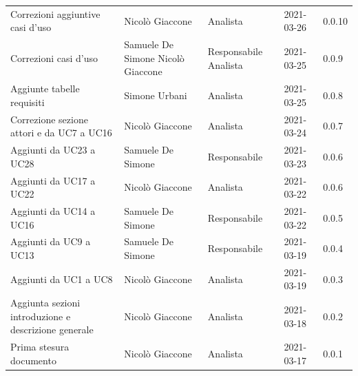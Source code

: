 \documentclass[a4paper]{article}
\begin{document}
\begin{center}
\begin{table}[h!]
\begin{tabular}{p{160px} p{90px} p{60px} p{60px} p{50px}}
            Correzioni aggiuntive casi d'uso                     & Nicolò Giaccone                            & Analista                       & 2021-03-26    & 0.0.10            \\
            Correzioni casi d'uso                                & Samuele De Simone \newline Nicolò Giaccone & Responsabile \newline Analista & 2021-03-25    & 0.0.9             \\
            Aggiunte tabelle requisiti                           & Simone Urbani                              & Analista                       & 2021-03-25    & 0.0.8             \\
            Correzione sezione attori e da UC7 a UC16            & Nicolò Giaccone                            & Analista                       & 2021-03-24    & 0.0.7             \\
            Aggiunti da UC23 a UC28                              & Samuele De Simone                          & Responsabile                   & 2021-03-23    & 0.0.6             \\
            Aggiunti da UC17 a UC22                              & Nicolò Giaccone                            & Analista                       & 2021-03-22    & 0.0.6             \\
            Aggiunti da UC14 a UC16                              & Samuele De Simone                          & Responsabile                   & 2021-03-22    & 0.0.5             \\
            Aggiunti da UC9 a UC13                               & Samuele De Simone                          & Responsabile                   & 2021-03-19    & 0.0.4             \\
            Aggiunti da UC1 a UC8                                & Nicolò Giaccone                            & Analista                       & 2021-03-19    & 0.0.3             \\
            Aggiunta sezioni introduzione e descrizione generale & Nicolò Giaccone                            & Analista                       & 2021-03-18    & 0.0.2             \\
            Prima stesura documento                              & Nicolò Giaccone                            & Analista                       & 2021-03-17    & 0.0.1             \\
        \end{tabular}
    \end{table}
\end{center}

\newpage
\tableofcontents
\listoffigures
\listoftables
\newpage




\end{document}
